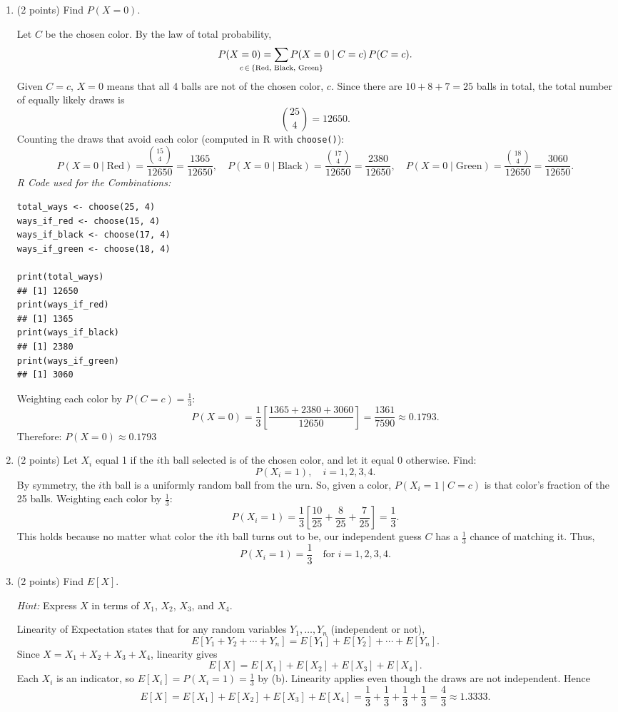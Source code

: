 \documentclass[letterpaper]{article}
\newcommand{\hint}[1]{\par{\footnotesize\textit{Hint:} #1\par}}
\begin{document}
\begin{enumerate}[label=(\alph*), leftmargin=*]
    \item (2 points) Find $P(X = 0)$.
    
    Let $C$ be the chosen color. By the law of total probability,
    \[
    P(X=0) = \sum_{\mathclap{c \, \in \, \{\text{Red, Black, Green}\}}} P(X=0 \mid C=c)\,P(C=c).
    \]
    Given $C = c$, $X = 0$ means that all 4 balls are not of the chosen color, $c$. Since there are $10 + 8 + 7 = 25$ balls in total, the total number of equally likely draws is
    \[
        \binom{25}{4} = 12650.
    \]
    Counting the draws that avoid each color (computed in R with \texttt{choose()}):
    \[
        P(X=0 \mid \text{Red}) = \frac{\binom{15}{4}}{12650} = \frac{1365}{12650}, \quad
        P(X=0 \mid \text{Black}) = \frac{\binom{17}{4}}{12650} = \frac{2380}{12650}, \quad
        P(X=0 \mid \text{Green}) = \frac{\binom{18}{4}}{12650} = \frac{3060}{12650}.
    \]
\textit{R Code used for the Combinations:}
\begin{verbatim}
total_ways <- choose(25, 4)
ways_if_red <- choose(15, 4)
ways_if_black <- choose(17, 4)
ways_if_green <- choose(18, 4)

print(total_ways)
## [1] 12650
print(ways_if_red)
## [1] 1365
print(ways_if_black)
## [1] 2380
print(ways_if_green)
## [1] 3060
\end{verbatim}
    Weighting each color by $P(C=c) = \tfrac{1}{3}$:
    \[
        P(X=0) = \frac{1}{3}\left[\frac{1365 + 2380 + 3060}{12650}\right] = \frac{1361}{7590} \approx 0.1793.
    \]
    $\boxed{\text{Therefore: } P(X=0)\approx 0.1793}$
    \item (2 points) Let $X_i$ equal 1 if the $i$th ball selected is of the chosen color, and let it equal 0 otherwise. Find:
    \[
        P(X_i = 1), \quad i = 1, 2, 3, 4.
    \]
    By symmetry, the $i$th ball is a uniformly random ball from the urn. So, given a color, $P(X_i = 1 \mid C=c)$ is that color's fraction of the 25 balls. Weighting each color by $\frac{1}{3}$:
    \[
        P(X_i = 1) = \frac{1}{3}\left[\frac{10}{25} + \frac{8}{25} + \frac{7}{25}\right] = \frac{1}{3}.
    \]
    This holds because no matter what color the $i$th ball turns out to be, our independent guess $C$ has a $\frac{1}{3}$ chance of matching it. Thus,
    \[
        \boxed{P(X_i = 1) = \frac{1}{3} \quad \text{for } i = 1, 2, 3, 4.}
    \]
    \item (2 points) Find $E[X]$.
    \hint{Express $X$ in terms of $X_1$, $X_2$, $X_3$, and $X_4$.}
    Linearity of Expectation states that for any random variables $Y_1, \dots, Y_n$ (independent or not),
    \[
        E[Y_1 + Y_2 + \cdots + Y_n] = E[Y_1] + E[Y_2] + \cdots + E[Y_n].
    \]
    Since $X = X_1 + X_2 + X_3 + X_4$, linearity gives
    \[
        E[X] = E[X_1] + E[X_2] + E[X_3] + E[X_4].
    \]
    Each $X_i$ is an indicator, so $E[X_i] = P(X_i = 1) = \tfrac{1}{3}$ by (b). Linearity applies even though the draws are not independent. Hence
    \[
    E[X] = E[X_1] + E[X_2] + E[X_3] + E[X_4] = \frac{1}{3} + \frac{1}{3} + \frac{1}{3} + \frac{1}{3} = \boxed{\frac{4}{3} \approx 1.3333}.
\]
\end{enumerate}
\end{document}
